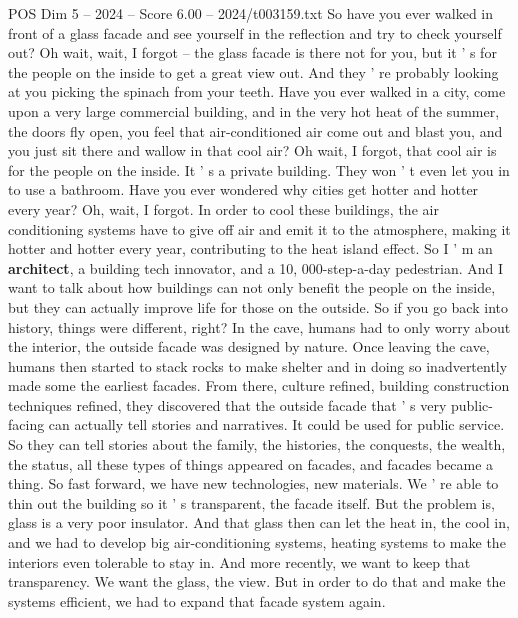 \begin{textsample}{POS Dim 5 – 2024 – Score 6.00 – 2024/t003159.txt}  \label{ex:f5_pos_068}
So have you ever walked in front of a glass facade and see yourself in the reflection and try to check yourself out?
Oh wait, wait, I forgot -- the glass facade is there not for you, but it ' s for the people on the inside to get a great view out.
And they ' re probably looking at you picking the spinach from your teeth.
Have you ever walked in a city, come upon a very large commercial building, and in the very hot heat of the summer, the doors fly open, you feel that air-conditioned air come out and blast you, and you just sit there and wallow in that cool air?
Oh wait, I forgot, that cool air is for the people on the inside.
It ' s a private building.
They won ' t even let you in to use a bathroom.
Have you ever wondered why cities get hotter and hotter every year?
Oh, wait, I forgot.
In order to cool these buildings, the air conditioning systems have to give off air and emit it to the atmosphere, making it hotter and hotter every year, contributing to the heat island effect.
So I ' m an \textbf{architect}, a building tech innovator, and a 10, 000-step-a-day pedestrian.
And I want to talk about how buildings can not only benefit the people on the inside, but they can actually improve life for those on the outside.
So if you go back into history, things were different, right?
In the cave, humans had to only worry about the interior, the outside facade was designed by nature.
Once leaving the cave, humans then started to stack rocks to make shelter and in doing so inadvertently made some the earliest facades.
From there, culture refined, building construction techniques refined, they discovered that the outside facade that ' s very public-facing can actually tell stories and narratives.
It could be used for public service.
So they can tell stories about the family, the histories, the conquests, the wealth, the status, all these types of things appeared on facades, and facades became a thing.
So fast forward, we have new technologies, new materials.
We ' re able to thin out the building so it ' s transparent, the facade itself.
But the problem is, glass is a very poor insulator.
And that glass then can let the heat in, the cool in, and we had to develop big air-conditioning systems, heating systems to make the interiors even tolerable to stay in.
And more recently, we want to keep that transparency.
We want the glass, the view.
But in order to do that and make the systems efficient, we had to expand that facade system again.

\end{textsample}
